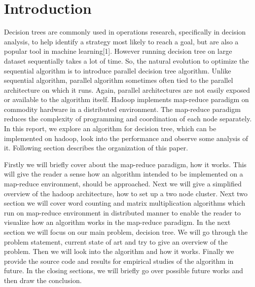 \documentclass{article}
\begin{document}
\section{Introduction}
Decision trees are commonly used in operations research, specifically in decision analysis, to help identify a strategy most likely to reach a goal, but are also a popular tool in machine learning[1]. However running decision tree on large dataset sequentially takes a lot of time. So, the natural evolution to optimize the sequential algorithm is to introduce parallel decision tree algorithm. Unlike sequential algorithm, parallel algorithm sometimes often tied to the parallel architecture on which it runs. Again, parallel architectures are not easily exposed or available to the algorithm itself. Hadoop implements map-reduce paradigm on commodity hardware in a distributed environment. The map-reduce paradigm reduces the complexity of programming and coordination of each node separately.
In this report, we explore an algorithm for decision tree, which can be implemented on hadoop, look into the performance and observe some analysis of it. Following section describes the organization of this paper.

Firstly we will briefly cover about the map-reduce paradigm, how it works. This will give the reader a sense how an algorithm intended to be implemented on a map-reduce environment, should be approached.
Next we will give a simplified overview of the hadoop architecture, how to set up a two node cluster.
Next two section we will cover word counting and matrix multiplication algorithms which run on map-reduce environment in distributed manner to enable the reader to visualize how an algorithm works in the map-reduce paradigm.
In the next section we will focus on our main problem, decision tree. We will go through the problem statement, current state of art and try to give an overview of the problem. Then we will look into the algorithm and how it works. Finally we provide the source code and results for empirical studies of the algorithm in future.
In the closing sections, we will briefly go over possible future works and then draw the conclusion.
\end{document}
